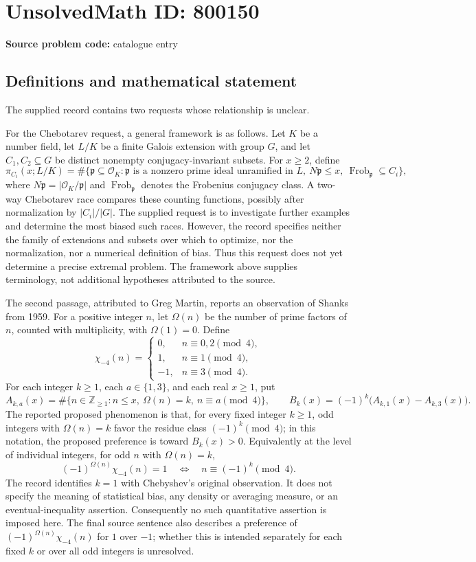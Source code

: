 \documentclass[11pt]{article}
\begin{document}
\section*{UnsolvedMath ID: 800150}
\textbf{Source problem code:} catalogue entry
\subsection{Definitions and mathematical statement}
The supplied record contains two requests whose relationship is unclear.

For the Chebotarev request, a general framework is as follows. Let \(K\) be a number field, let \(L/K\) be a finite Galois extension with group \(G\), and let \(C_1,C_2\subseteq G\) be distinct nonempty conjugacy-invariant subsets. For \(x\ge 2\), define
\[
\pi_{C_i}(x;L/K)=\#\{\mathfrak p\subseteq\mathcal O_K:\mathfrak p\text{ is a nonzero prime ideal unramified in }L,\ N\mathfrak p\le x,\ \operatorname{Frob}_{\mathfrak p}\subseteq C_i\},
\]
where \(N\mathfrak p=|\mathcal O_K/\mathfrak p|\) and \(\operatorname{Frob}_{\mathfrak p}\) denotes the Frobenius conjugacy class. A two-way Chebotarev race compares these counting functions, possibly after normalization by \(|C_i|/|G|\). The supplied request is to investigate further examples and determine the most biased such races. However, the record specifies neither the family of extensions and subsets over which to optimize, nor the normalization, nor a numerical definition of bias. Thus this request does not yet determine a precise extremal problem. The framework above supplies terminology, not additional hypotheses attributed to the source.

The second passage, attributed to Greg Martin, reports an observation of Shanks from 1959. For a positive integer \(n\), let \(\Omega(n)\) be the number of prime factors of \(n\), counted with multiplicity, with \(\Omega(1)=0\). Define
\[
\chi_{-4}(n)=
\begin{cases}
0,&n\equiv0,2\pmod4,\\
1,&n\equiv1\pmod4,\\
-1,&n\equiv3\pmod4.
\end{cases}
\]
For each integer \(k\ge1\), each \(a\in\{1,3\}\), and each real \(x\ge1\), put
\[
A_{k,a}(x)=\#\{n\in\mathbb Z_{\ge1}:n\le x,\ \Omega(n)=k,\ n\equiv a\pmod4\},
\qquad
B_k(x)=(-1)^k\bigl(A_{k,1}(x)-A_{k,3}(x)\bigr).
\]
The reported proposed phenomenon is that, for every fixed integer \(k\ge1\), odd integers with \(\Omega(n)=k\) favor the residue class \((-1)^k\pmod4\); in this notation, the proposed preference is toward \(B_k(x)>0\). Equivalently at the level of individual integers, for odd \(n\) with \(\Omega(n)=k\),
\[
(-1)^{\Omega(n)}\chi_{-4}(n)=1
\quad\Longleftrightarrow\quad
n\equiv(-1)^k\pmod4.
\]
The record identifies \(k=1\) with Chebyshev's original observation. It does not specify the meaning of statistical bias, any density or averaging measure, or an eventual-inequality assertion. Consequently no such quantitative assertion is imposed here. The final source sentence also describes a preference of \((-1)^{\Omega(n)}\chi_{-4}(n)\) for \(1\) over \(-1\); whether this is intended separately for each fixed \(k\) or over all odd integers is unresolved.
\end{document}
